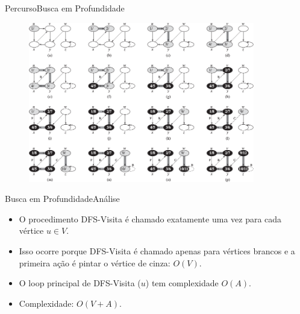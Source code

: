 \documentclass[aspectratio=169]{beamer}
\begin{document}
\begin{frame}{Percurso}{Busca em Profundidade}
\begin{figure}[!h]
  \centering
  \includegraphics[width=280pt]{imagens/DFS_cormen.png}
  \label{fig_dfs_cormen}
\end{figure}
\end{frame}


\begin{frame}{Busca em Profundidade}{Análise}
\begin{itemize}
\item O procedimento DFS-Visita é chamado exatamente uma vez para cada vértice $u \in V$.
\item Isso ocorre porque DFS-Visita é chamado apenas para vértices brancos e a primeira ação é pintar o vértice de cinza: $O(V)$.
\item O loop principal de DFS-Visita ($u$) tem complexidade $O(A)$.
\item Complexidade: $O(V + A)$.
\end{itemize}
\end{frame}

%
%

\end{document}
